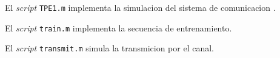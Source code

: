 \documentclass{article}
\begin{document}
\begin{ttfamily}
\begin{center}
\end{center}
\end{ttfamily}

\par El \textit{script} \verb+TPE1.m+ implementa la simulacion del sistema de comunicacion .

\begin{ttfamily}
\begin{center}
\end{center}
\end{ttfamily}

\par El \textit{script} \verb+train.m+ implementa la secuencia de entrenamiento.

\begin{ttfamily}
\begin{center}
\end{center}
\end{ttfamily}

\par El \textit{script} \verb+transmit.m+ simula la transmicion por el canal.

\begin{ttfamily}
\begin{center}
\end{center}
\end{ttfamily}
\end{document}
